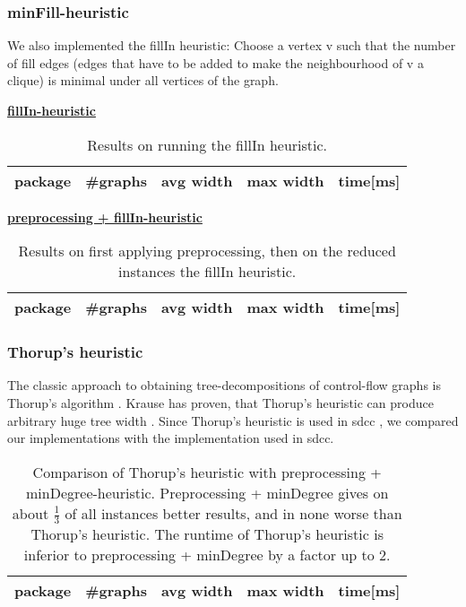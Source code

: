 \documentclass[a4wide]{article}
\begin{document}
\subsubsection{minFill-heuristic}

We also implemented the fillIn heuristic: Choose a vertex v such that the number of fill edges (edges that have to be added to make the neighbourhood of v a clique) is minimal under all vertices of the graph. \\

\begin{table}[h!]
\underline{\textbf{fillIn-heuristic}} \\
\begin{tabular}{|l|l|l|l|l|}
\hline
package & \#graphs & avg width & max width & time[ms] \\
\hline
\hline

\hline
\end{tabular}
\caption{\small{Results on running the fillIn heuristic.} }
\end{table}

\begin{table}[h!]
\underline{\textbf{preprocessing + fillIn-heuristic}} \\
\begin{tabular}{|l|l|l|l|l|}
\hline
package & \#graphs & avg width & max width & time[ms] \\
\hline
\hline

\hline
\end{tabular}
\caption{\small{Results on first applying preprocessing, then on the reduced instances the fillIn heuristic.}}
\end{table}


\subsubsection{Thorup's heuristic}

The classic approach to obtaining tree-decompositions of control-flow graphs is Thorup's algorithm \cite{thorup}. Krause has proven, that Thorup's heuristic can produce arbitrary huge tree width \cite{C-tree}. Since Thorup's heuristic is used in sdcc \cite{sdcc}, we compared our implementations with the implementation used in sdcc.

\vspace*{0.5cm}

\begin{table}[h!]
\begin{tabular}{|l|l|l|l|l|}
\hline
package & \#graphs & avg width & max width & time[ms] \\
\hline
\hline

\hline
\end{tabular}
\caption{Comparison of Thorup's heuristic with preprocessing + minDegree-heuristic. Preprocessing + minDegree gives on about $\frac{1}{3}$ of all instances better results, and in none worse than Thorup's heuristic. The runtime of Thorup's heuristic is inferior to preprocessing + minDegree by a factor up to 2.}
\end{table}
\end{document}
